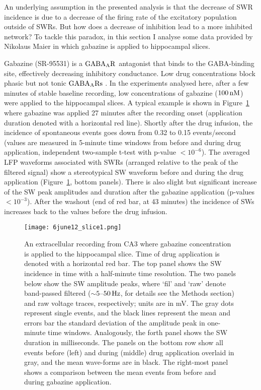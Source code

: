     An underlying assumption in the presented analysis is that the decrease of
    SWR incidence is due to a decrease of the firing rate of the excitatory
    population outside of SWRs. But how does a decrease of inhibition lead to a
    more inhibited network? To tackle this paradox, in this section I analyse
    some data provided by Nikolaus Maier in which gabazine is applied to
    hippocampal slices.
    
    Gabazine (SR-95531) is a $\rm GABA_AR$ antagonist that binds to the
    GABA-binding site, effectively decreasing inhibitory conductance. Low drug
    concentrations block phasic but not tonic $\rm GABA_ARs$ \citep{Bai2001,
    Yeung2003, Behrens2007}. In the experiments analysed here, after a few
    minutes of stable baseline recording, low concentrations of gabazine ($100
    \,\rm nM$) were applied to the hippocampal slices. A typical example is
    shown in Figure~\ref{fig:gabazine_ex} where gabazine was applied 27 minutes
    after the recording onset (application duration denoted with a horizontal
    red line). Shortly after the drug infusion, the incidence of spontaneous
    events goes down from 0.32 to 0.15 events/second (values are measured in
    5-minute time windows from before and during drug application, independent
    two-sample t-test with p-value $<10^{-6}$). The averaged LFP waveforms
    associated with SWRs (arranged relative to the peak of the filtered signal)
    show a stereotypical SW waveform before and during the drug application
    (Figure~\ref{fig:gabazine_ex}, bottom panels). There is also slight but
    significant increase of the SW peak amplitudes and duration after the
    gabazine application (p-values $<10^{-3}$). After the washout (end of red
    bar, at 43 minutes) the incidence of SWs increases back to the values
    before the drug infusion.
    
    \begin{figure}
      \center
      \texttt{[image: 6june12\_slice1.png]}
      \caption{
        An extracellular recording from CA3 where gabazine concentration is applied to
        the hippocampal slice. Time of drug application is denoted with a
        horizontal red bar. The top panel shows the SW incidence in time with a
        half-minute time resolution. The two panels below show the SW amplitude
        peaks, where `fil' and `raw' denote band-passed filtered ($\sim
        5$--$50\, \rm Hz$, for details see the Methods section) and raw voltage
        traces, respectively; units are in mV. The gray dots represent single
        events, and the black lines represent the mean and errors bar the standard
        deviation of the amplitude peak in one-minute time windows. Analogously,
        the forth panel shows the SW duration in milliseconds. The panels on
        the bottom row show all events before (left) and during (middle) drug
        application overlaid in gray, and the mean wave-forms are in black. The
        right-most panel shows a comparison between the mean events from before
        and during gabazine application.
      }
      \label{fig:gabazine_ex}
    \end{figure}

